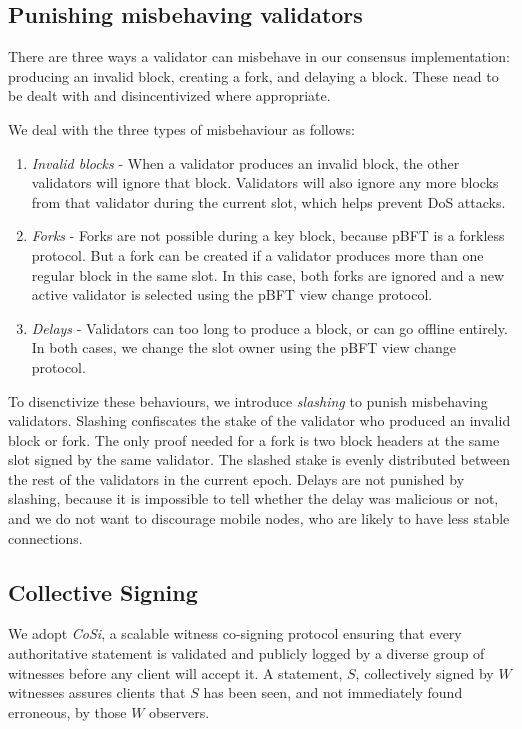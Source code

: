 \documentclass[8pt,fleqn,openany]{book}
\begin{document}
	\subsection{Punishing misbehaving validators}
	There are three ways a validator can misbehave in our consensus implementation: producing an invalid block, creating a fork, and delaying a block. These nead to be dealt with and disincentivized where appropriate.
	
	We deal with the three types of misbehaviour as follows:
	
	\begin{enumerate}
		\item {\em Invalid blocks} - When a validator produces an invalid block, the other validators will ignore that block. Validators will also ignore any more blocks from that validator during the current slot, which helps prevent DoS attacks.
		\item {\em Forks} - Forks are not possible during a key block, because pBFT is a forkless protocol. But a fork can be created if a validator produces more than one regular block in the same slot. In this case, both forks are ignored and a new active validator is selected using the pBFT view change protocol. 
		\item {\em Delays} - Validators can too long to produce a block, or can go offline entirely. In both cases, we change the slot owner using the pBFT view change protocol. 
	\end{enumerate}
	
	To disenctivize these behaviours, we introduce \textit{slashing} to punish misbehaving validators. Slashing confiscates the stake of the validator who produced an invalid block or fork. The only proof needed for a fork is two block headers at the same slot signed by the same validator. The slashed stake is evenly distributed between the rest of the validators in the current epoch. Delays are not punished by slashing, because it is impossible to tell whether the delay was malicious or not, and we do not want to discourage mobile nodes, who are likely to have less stable connections.
	
	\subsection{Collective Signing}
	We adopt \textit{CoSi}\cite{c10,c11}, a scalable witness co-signing protocol ensuring that every authoritative statement is validated and publicly logged by a diverse group of witnesses before any client will accept it. A statement, $S$, collectively signed by $W$ witnesses assures clients that $S$ has been seen, and not immediately found erroneous, by those $W$ observers. 
	
\end{document}

